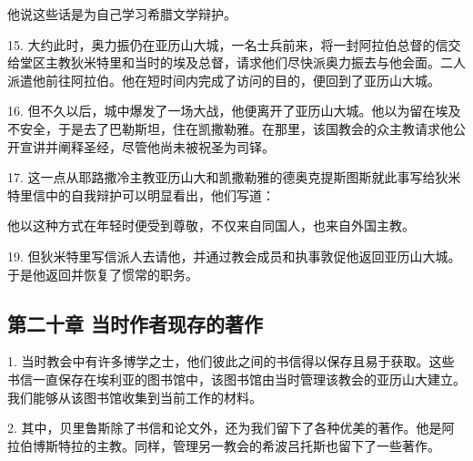 \par

他说这些话是为自己学习希腊文学辩护。\par

15. 大约此时，奥力振仍在亚历山大城，一名士兵前来，将一封阿拉伯总督的信交给堂区主教狄米特里和当时的埃及总督，请求他们尽快派奥力振去与他会面。二人派遣他前往阿拉伯。他在短时间内完成了访问的目的，便回到了亚历山大城。\par

16. 但不久以后，城中爆发了一场大战，他便离开了亚历山大城。他以为留在埃及不安全，于是去了巴勒斯坦，住在凯撒勒雅。在那里，该国教会的众主教请求他公开宣讲并阐释圣经，尽管他尚未被祝圣为司铎。\par

17. 这一点从耶路撒冷主教亚历山大和凯撒勒雅的德奥克提斯图斯就此事写给狄米特里信中的自我辩护可以明显看出，他们写道：\par

\par

\par

他以这种方式在年轻时便受到尊敬，不仅来自同国人，也来自外国主教。\par

19. 但狄米特里写信派人去请他，并通过教会成员和执事敦促他返回亚历山大城。于是他返回并恢复了惯常的职务。\par


\subsection{第二十章 当时作者现存的著作}

1. 当时教会中有许多博学之士，他们彼此之间的书信得以保存且易于获取。这些书信一直保存在埃利亚的图书馆中，该图书馆由当时管理该教会的亚历山大建立。我们能够从该图书馆收集到当前工作的材料。\par

2. 其中，贝里鲁斯除了书信和论文外，还为我们留下了各种优美的著作。他是阿拉伯博斯特拉的主教。同样，管理另一教会的希波吕托斯也留下了一些著作。\par

